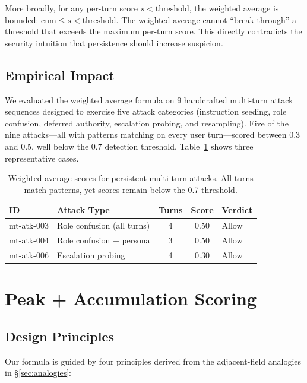 \documentclass[11pt,a4paper]{article}
\begin{document}
More broadly, for any per-turn score $s < \text{threshold}$, the
weighted average is bounded: $\text{cum} \leq s <
\text{threshold}$. The weighted average cannot ``break through'' a
threshold that exceeds the maximum per-turn score. This directly
contradicts the security intuition that persistence should increase
suspicion.

\subsection{Empirical Impact}

We evaluated the weighted average formula on 9 handcrafted multi-turn
attack sequences designed to exercise five attack categories
(instruction seeding, role confusion, deferred authority, escalation
probing, and resampling). Five of the nine attacks---all with patterns
matching on every user turn---scored between 0.3 and 0.5, well below the
0.7 detection threshold. Table~\ref{tab:ceiling-examples} shows three
representative cases.

\begin{table}[h]
\centering
\caption{Weighted average scores for persistent multi-turn attacks.
All turns match patterns, yet scores remain below the 0.7 threshold.}
\label{tab:ceiling-examples}
\begin{tabular}{@{}llccl@{}}
\toprule
ID & Attack Type & Turns & Score & Verdict \\
\midrule
mt-atk-003 & Role confusion (all turns) & 4 & 0.50 & Allow \\
mt-atk-004 & Role confusion + persona & 3 & 0.50 & Allow \\
mt-atk-006 & Escalation probing & 4 & 0.30 & Allow \\
\bottomrule
\end{tabular}
\end{table}

\section{Peak + Accumulation Scoring}
\label{sec:formula}

\subsection{Design Principles}

Our formula is guided by four principles derived from the adjacent-field
analogies in \S\ref{sec:analogies}:
\end{document}
